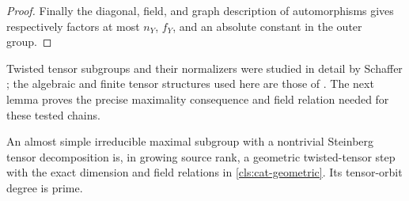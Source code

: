 \begin{proof}
Finally the diagonal, field, and graph
description of automorphisms gives respectively factors at most
$n_Y$, $f_Y$, and an absolute constant in the outer group.
\end{proof}

Twisted tensor subgroups and their normalizers were studied in detail by
Schaffer \cite{Schaffer1999}; the algebraic and finite tensor structures
used here are those of \cite[Section~4(5)]{LiebeckSeitzClassical1998}.
The next lemma proves the precise maximality consequence and field relation
needed for these tested chains.

\begin{lemma}\label{cls:twisted-tensor}
An almost simple irreducible maximal subgroup with a nontrivial
Steinberg tensor decomposition is, in growing source rank, a geometric
twisted-tensor step with the exact dimension and field relations in
\ref{cls:cat-geometric}.  Its tensor-orbit degree is prime.
\end{lemma}
